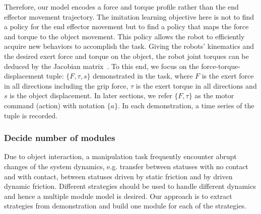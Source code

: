 Therefore, our model encodes a force and torque profile rather than the end effector movement trajectory. The imitation learning objective here is not to find a policy for the end effector movement but to find a policy that maps the force and torque to the object movement. This policy allows the robot to efficiently acquire new behaviors to accomplish the task. %
Giving the robots' kinematics and the desired exert force and torque on the object, the robot joint torques can be deduced by the Jacobian matrix~\citep{okamura2000overview}. To this end, we focus on the  force-torque-displacement tuple: $\{F,\tau,s\}$ demonstrated in the task, where $F$ is the exert force in all directions including the grip force, $\tau$ is the exert torque in all directions and $s$ is the object displacement. In later sections, we refer $\{F,\tau\}$ as the motor command (action) with notation $\{a\}$. In each demonstration, a time series of the tuple is recorded.



\subsubsection{Decide number of modules}
\label{sec:cluster}

Due to object interaction, a manipulation task frequently encounter abrupt changes of the system dynamics, e.g. transfer between statuses with no contact and with contact, between statuses driven by static friction and by driven dynamic friction. Different strategies should be used to handle different dynamics and hence a multiple module model is desired. Our approach is to extract strategies from demonstration and build one module for each of the strategies. %


